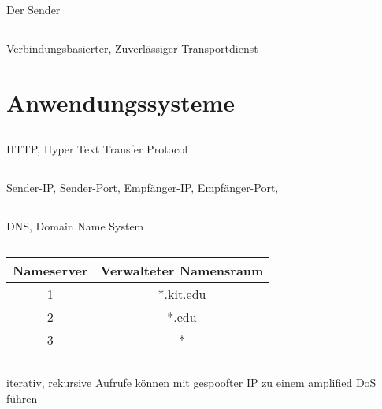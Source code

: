 \documentclass[a4paper]{article}
\begin{document}
\subsection{}
Der Sender
\subsection{}
Verbindungsbasierter, Zuverlässiger Transportdienst
\pagebreak
\section{Anwendungssysteme}
\subsection{}
HTTP, Hyper Text Transfer Protocol
\subsection{}
Sender-IP, Sender-Port, Empfänger-IP, Empfänger-Port, 
\subsection{}
DNS, Domain Name System
\subsection{}
\begin{tabular}{|c|c|}\hline
Nameserver & Verwalteter Namensraum \\ \hline
1 & *.kit.edu\\ \hline
2 & *.edu\\ \hline
3 & *\\ \hline
\end{tabular}
\subsection{}
iterativ, rekursive Aufrufe können mit gespoofter IP zu einem amplified DoS führen
\end{document}
